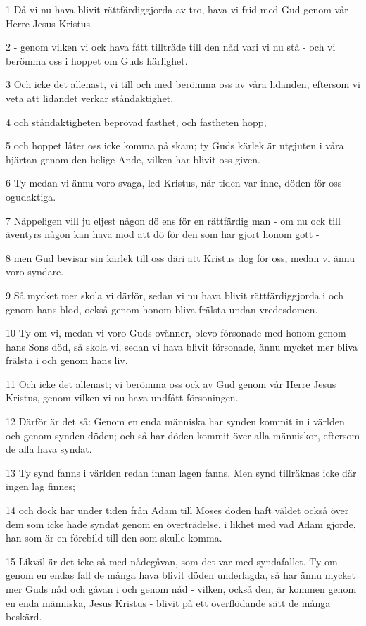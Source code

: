 \par 1 Då vi nu hava blivit rättfärdiggjorda av tro, hava vi frid med Gud genom vår Herre Jesus Kristus
\par 2 - genom vilken vi ock hava fått tillträde till den nåd vari vi nu stå - och vi berömma oss i hoppet om Guds härlighet.
\par 3 Och icke det allenast, vi till och med berömma oss av våra lidanden, eftersom vi veta att lidandet verkar ståndaktighet,
\par 4 och ståndaktigheten beprövad fasthet, och fastheten hopp,
\par 5 och hoppet låter oss icke komma på skam; ty Guds kärlek är utgjuten i våra hjärtan genom den helige Ande, vilken har blivit oss given.
\par 6 Ty medan vi ännu voro svaga, led Kristus, när tiden var inne, döden för oss ogudaktiga.
\par 7 Näppeligen vill ju eljest någon dö ens för en rättfärdig man - om nu ock till äventyrs någon kan hava mod att dö för den som har gjort honom gott -
\par 8 men Gud bevisar sin kärlek till oss däri att Kristus dog för oss, medan vi ännu voro syndare.
\par 9 Så mycket mer skola vi därför, sedan vi nu hava blivit rättfärdiggjorda i och genom hans blod, också genom honom bliva frälsta undan vredesdomen.
\par 10 Ty om vi, medan vi voro Guds ovänner, blevo försonade med honom genom hans Sons död, så skola vi, sedan vi hava blivit försonade, ännu mycket mer bliva frälsta i och genom hans liv.
\par 11 Och icke det allenast; vi berömma oss ock av Gud genom vår Herre Jesus Kristus, genom vilken vi nu hava undfått försoningen.
\par 12 Därför är det så: Genom en enda människa har synden kommit in i världen och genom synden döden; och så har döden kommit över alla människor, eftersom de alla hava syndat.
\par 13 Ty synd fanns i världen redan innan lagen fanns. Men synd tillräknas icke där ingen lag finnes;
\par 14 och dock har under tiden från Adam till Moses döden haft väldet också över dem som icke hade syndat genom en överträdelse, i likhet med vad Adam gjorde, han som är en förebild till den som skulle komma.
\par 15 Likväl är det icke så med nådegåvan, som det var med syndafallet. Ty om genom en endas fall de många hava blivit döden underlagda, så har ännu mycket mer Guds nåd och gåvan i och genom nåd - vilken, också den, är kommen genom en enda människa, Jesus Kristus - blivit på ett överflödande sätt de många beskärd.
